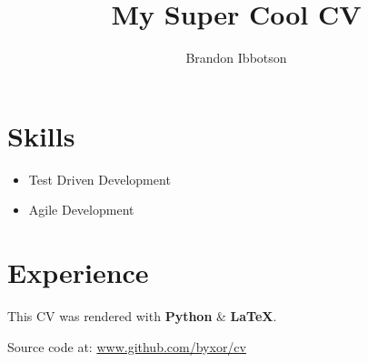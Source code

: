 \documentclass{article}
\begin{document}
\author{Brandon Ibbotson}
\title{My Super Cool CV}
\maketitle
\section{Skills}
\begin{itemize}
 \item Test Driven Development
 \item Agile Development
\end{itemize}
\section{Experience}
\vspace*{\fill}
\begin{center}
This CV was rendered with \textbf{Python} {\&} \textbf{{\LaTeX}}.

Source code at: \url{www.github.com/byxor/cv}
\end{center}
\end{document}
